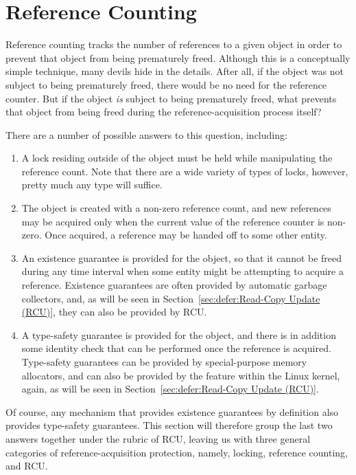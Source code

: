 
\section{Reference Counting}
\label{sec:defer:Reference Counting}

Reference counting tracks the number of references
to a given object in order to prevent that object from being prematurely
freed.
Although this is a conceptually simple technique, many devils hide in
the details.
After all, if the object was not subject to being prematurely freed,
there would be no need for the reference counter.
But if the object \emph{is} subject to being prematurely freed,
what prevents that object from being freed during
the reference-acquisition process itself?

There are a number of possible answers to this question, including:

\begin{enumerate}
\item	A lock residing outside of the object must be held while
	manipulating the reference count.
	Note that there are a wide variety of types of locks,
	however, pretty much any type will suffice.
\item	The object is created with a non-zero reference count, and new
	references may be acquired only when the current value of
	the reference counter is non-zero.
	Once acquired, a reference may be handed off to some
	other entity.
\item	An existence guarantee is provided for the object, so that
	it cannot be freed during any time interval when some
	entity might be attempting to acquire a reference.
	Existence guarantees are often provided by automatic
	garbage collectors, and, as will be seen in
	Section~\ref{sec:defer:Read-Copy Update (RCU)}, they can
	also be provided by RCU.
\item	A type-safety guarantee is provided for the object, and there
	is in addition some identity check that can be performed once
	the reference is acquired.
	Type-safety guarantees can be provided by special-purpose
	memory allocators, and can also be provided by the
	 feature within the Linux kernel,
	again, as will be seen in
	Section~\ref{sec:defer:Read-Copy Update (RCU)}.
\end{enumerate}

Of course, any mechanism that provides existence guarantees
by definition also provides type-safety guarantees.
This section will therefore group the last two answers together under the
rubric of RCU, leaving us with three general categories of
reference-acquisition protection, namely, locking, reference counting,
and RCU.

